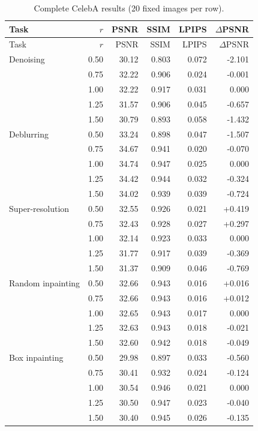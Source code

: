 \documentclass[11pt,a4paper]{article}
\begin{document}
\begin{longtable}{lrrrrr}

\caption{
Complete CelebA results (20 fixed images per row).
}
\label{tab:allceleba}
\\

\toprule
Task & $r$ & PSNR & SSIM & LPIPS & $\Delta$PSNR\\
\midrule
\endfirsthead

\toprule
Task & $r$ & PSNR & SSIM & LPIPS & $\Delta$PSNR\\
\midrule
\endhead

Denoising & 0.50 & 30.12 & 0.803 & 0.072 & -2.101\\
& 0.75 & 32.22 & 0.906 & 0.024 & -0.001\\
& 1.00 & 32.22 & 0.917 & 0.031 & 0.000\\
& 1.25 & 31.57 & 0.906 & 0.045 & -0.657\\
& 1.50 & 30.79 & 0.893 & 0.058 & -1.432\\

\midrule

Deblurring & 0.50 & 33.24 & 0.898 & 0.047 & -1.507\\
& 0.75 & 34.67 & 0.941 & 0.020 & -0.070\\
& 1.00 & 34.74 & 0.947 & 0.025 & 0.000\\
& 1.25 & 34.42 & 0.944 & 0.032 & -0.324\\
& 1.50 & 34.02 & 0.939 & 0.039 & -0.724\\

\midrule

Super-resolution & 0.50 & 32.55 & 0.926 & 0.021 & +0.419\\
& 0.75 & 32.43 & 0.928 & 0.027 & +0.297\\
& 1.00 & 32.14 & 0.923 & 0.033 & 0.000\\
& 1.25 & 31.77 & 0.917 & 0.039 & -0.369\\
& 1.50 & 31.37 & 0.909 & 0.046 & -0.769\\

\midrule

Random inpainting & 0.50 & 32.66 & 0.943 & 0.016 & +0.016\\
& 0.75 & 32.66 & 0.943 & 0.016 & +0.012\\
& 1.00 & 32.65 & 0.943 & 0.017 & 0.000\\
& 1.25 & 32.63 & 0.943 & 0.018 & -0.021\\
& 1.50 & 32.60 & 0.942 & 0.018 & -0.049\\

\midrule

Box inpainting & 0.50 & 29.98 & 0.897 & 0.033 & -0.560\\
& 0.75 & 30.41 & 0.932 & 0.024 & -0.124\\
& 1.00 & 30.54 & 0.946 & 0.021 & 0.000\\
& 1.25 & 30.50 & 0.947 & 0.023 & -0.040\\
& 1.50 & 30.40 & 0.945 & 0.026 & -0.135\\

\bottomrule

\end{longtable}
\end{document}
